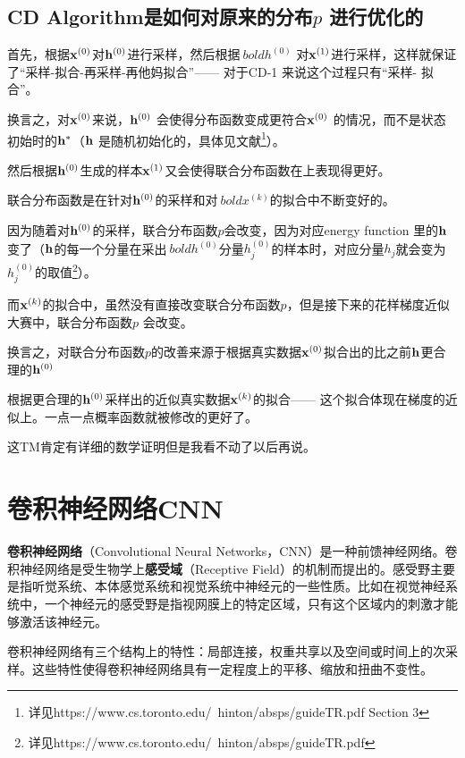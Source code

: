 \documentclass[11pt,fleqn, UTF8]{ctexbook} %
\begin{document}
\section{CD Algorithm是如何对原来的分布$p$ 进行优化的}
首先，根据$\bold{x}^{(0)}$对$\bold{h}^{(0)}$进行采样，然后根据$\ bold{h}^{(0)}$ 对$\bold{x}^{(1)}$进行采样，这样就保证了“采样-拟合-再采样-再他妈拟合”—— 对于CD-1 来说这个过程只有“采样- 拟合”。

换言之，对$\bold{x}^{(0)}$来说，$\bold{h}^{(0)}$ 会使得分布函数变成更符合$\bold{x}^{(0)}$ 的情况，而不是状态初始时的$\bold{h}^{*}$（$\bold{h}$ 是随机初始化的，具体见文献\footnote{详见https://www.cs.toronto.edu/~hinton/absps/guideTR.pdf Section 3}）。

然后根据$\bold{h}^{(0)}$生成的样本$\bold{x}^{(1)}$又会使得联合分布函数在上表现得更好。

联合分布函数是在针对$\bold{h}^{(0)}$的采样和对$\ bold{x}^{(k)}$的拟合中不断变好的。

因为随着对$\bold{h}^{(0)}$的采样，联合分布函数$p$会改变，因为对应energy function 里的$\bold{h}$ 变了（$\bold{h}$的每一个分量在采出$\ bold{h}^{(0)}$分量$h_j^{(0)}$的样本时，对应分量$h_j$就会变为$h_j^{(0)} $的取值\footnote{详见https://www.cs.toronto.edu/~hinton/absps/guideTR.pdf}）。


而$\bold{x}^{(k)}$的拟合中，虽然没有直接改变联合分布函数$p$，但是接下来的花样梯度近似大赛中，联合分布函数$p$ 会改变。

换言之，对联合分布函数$p$的改善来源于根据真实数据$\bold{x}^{(0)}$拟合出的比之前$\bold{h}$更合理的$\bold{h}^{(0)}$

根据更合理的$\bold{h}^{(0)}$采样出的近似真实数据$\bold{x}^{(k)}$的拟合—— 这个拟合体现在梯度的近似上。一点一点概率函数就被修改的更好了。

这TM肯定有详细的数学证明但是我看不动了以后再说。
\chapter{卷积神经网络CNN}
\textbf{卷积神经网络}（Convolutional Neural Networks，CNN）是一种前馈神经网络。卷积神经网络是受生物学上\textbf{感受域}（Receptive Field）的机制而提出的。感受野主要是指听觉系统、本体感觉系统和视觉系统中神经元的一些性质。比如在视觉神经系统中，一个神经元的感受野是指视网膜上的特定区域，只有这个区域内的刺激才能够激活该神经元\cite{hubel1968receptive}。

卷积神经网络有三个结构上的特性：局部连接，权重共享以及空间或时间上的次采样。这些特性使得卷积神经网络具有一定程度上的平移、缩放和扭曲不变性\cite{lecun1998gradient}。
\end{document}

